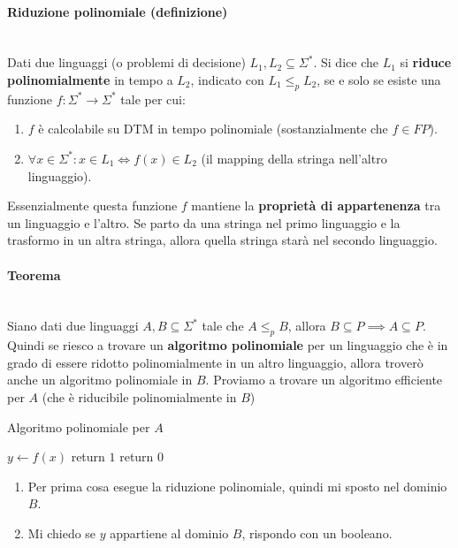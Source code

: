 \documentclass{article}
\begin{document}
\paragraph{Riduzione polinomiale (definizione)}\mbox{}\\
Dati due linguaggi (o problemi di decisione) $L_1,L_2\subseteq\Sigma^*$. Si dice che
$L_1$ si \textbf{riduce polinomialmente} in tempo a $L_2$, indicato con $L_1\leq_{p} L_2$,
se e solo se esiste una funzione $f:\Sigma^*\rightarrow\Sigma^*$ tale per cui:
\begin{enumerate}
    \item $f$ è calcolabile su DTM in tempo polinomiale (sostanzialmente che $f\in FP$).
    \item $\forall x\in\Sigma^*:x\in L_1\Leftrightarrow f(x)\in L_2$ (il mapping della
          stringa nell'altro linguaggio).
\end{enumerate}
Essenzialmente questa funzione $f$ mantiene la \textbf{proprietà di appartenenza} tra un linguaggio
e l'altro. Se parto da una stringa nel primo linguaggio e la trasformo in un altra stringa,
allora quella stringa starà nel secondo linguaggio.
\paragraph{Teorema}\mbox{}\\
Siano dati due linguaggi $A,B\subseteq\Sigma^*$ tale che $A\leq_p B$, allora
$B\subseteq P\implies A\subseteq P$. Quindi se riesco a trovare un \textbf{algoritmo polinomiale}
per un linguaggio che è in grado di essere ridotto polinomialmente in un altro linguaggio,
allora troverò anche un algoritmo polinomiale in $B$.
Proviamo a trovare un algoritmo efficiente per $A$ (che è riducibile polinomialmente in $B$)
\begin{algorithm}[hbt!]
    \caption{Algoritmo polinomiale per $A$}\label{alg:poly-a}
    $y\leftarrow f(x)$\;
    {
        return $1$\;
    }
    return $0$\;
\end{algorithm}
\begin{enumerate}
    \item Per prima cosa esegue la riduzione polinomiale, quindi mi sposto nel dominio $B$.
    \item Mi chiedo se $y$ appartiene al dominio $B$, rispondo con un booleano.
\end{enumerate}
\end{document}
